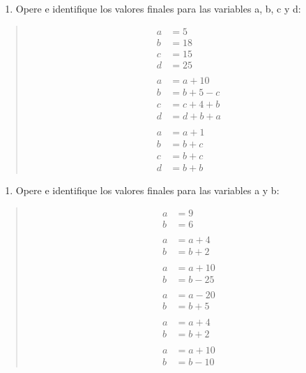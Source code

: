 \documentclass[letterpaper,10pt,spanish]{sphinxmanual}
\begin{document}
\begin{enumerate}
%
\setcounter{enumi}{2}
\item {} 
\sphinxAtStartPar
Opere e identifique los valores finales para las variables a, b, c y d:

\end{enumerate}
\begin{quote}
\begin{equation*}
\begin{split}a &= 5
\\ b &= 18
\\ c &= 15
\\ d &= 25
\\
\\ a &= a + 10
\\ b &= b + 5 - c
\\ c &= c + 4 + b
\\ d &= d + b + a
\\
\\ a &= a + 1
\\ b &= b + c
\\ c &= b + c
\\ d &= b + b\end{split}
\end{equation*}\end{quote}
\begin{enumerate}
%
\setcounter{enumi}{3}
\item {} 
\sphinxAtStartPar
Opere e identifique los valores finales para las variables a y b:

\end{enumerate}
\begin{quote}
\begin{equation*}
\begin{split}a &= 9
\\ b &= 6
\\
\\ a &= a + 4
\\ b &= b + 2
\\
\\ a &= a + 10
\\ b &= b - 25
\\
\\ a &= a - 20
\\ b &= b + 5
\\
\\ a &= a + 4
\\ b &= b + 2
\\
\\ a &= a + 10
\\ b &= b - 10\end{split}
\end{equation*}\end{quote}
\end{document}
